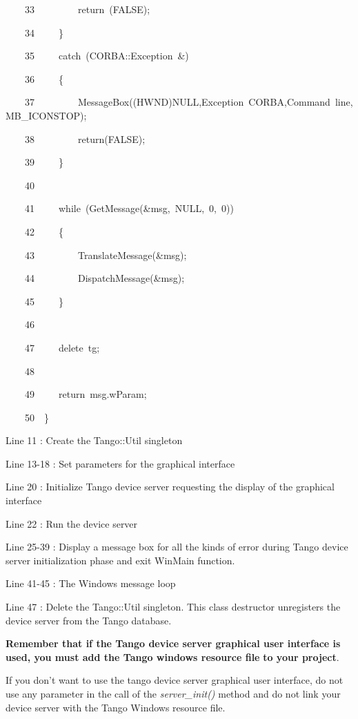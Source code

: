 \begin{lyxcode}
~~~~33~~~~~~~~~return~(FALSE);

~~~~34~~~~~\}

~~~~35~~~~~catch~(CORBA::Exception~\&)

~~~~36~~~~~\{

~~~~37~~~~~~~~~MessageBox((HWND)NULL,\textquotedbl{}Exception~CORBA\textquotedbl{},\textquotedbl{}Command~line\textquotedbl{},MB\_ICONSTOP);

~~~~38~~~~~~~~~return(FALSE);

~~~~39~~~~~\}

~~~~40~~

~~~~41~~~~~while~(GetMessage(\&msg,~NULL,~0,~0))~

~~~~42~~~~~\{

~~~~43~~~~~~~~~TranslateMessage(\&msg);

~~~~44~~~~~~~~~DispatchMessage(\&msg);

~~~~45~~~~~\}

~~~~46~~

~~~~47~~~~~delete~tg;

~~~~48~~

~~~~49~~~~~return~msg.wParam;

~~~~50~~\}
\end{lyxcode}


Line 11 : Create the Tango::Util singleton

Line 13-18 : Set parameters for the graphical interface

Line 20 : Initialize Tango device server requesting the display of
the graphical interface

Line 22 : Run the device server

Line 25-39 : Display a message box for all the kinds of error during
Tango device server initialization phase and exit WinMain
function.

Line 41-45 : The Windows message loop

Line 47 : Delete the Tango::Util singleton. This class destructor
unregisters the device server from the Tango database.

\textbf{Remember that if the Tango device server graphical user interface
is used, you must add the Tango windows resource
file} \textbf{to your project}.

If you don't want to use the tango device server graphical user interface,
do not use any parameter in the call of the \emph{server\_init()}
method and do not link your device server with the Tango Windows resource
file.

